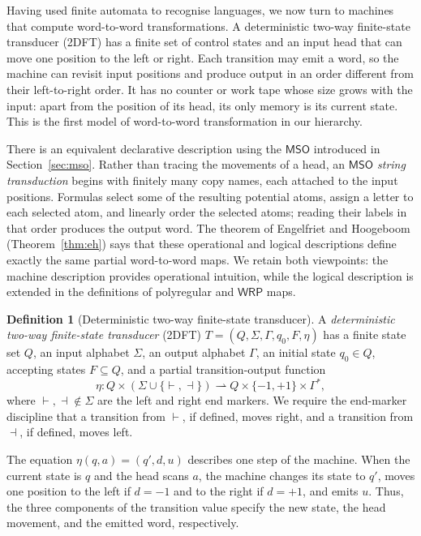 \documentclass[11pt]{article}
\theoremstyle{definition}
\newtheorem{definition}[theorem]{Definition}
\newcommand{\WRP}{\mathsf{WRP}}
\newcommand{\MSO}{\mathsf{MSO}}
\begin{document}
Having used finite automata to recognise languages, we now turn to machines
that compute word-to-word transformations.  A deterministic two-way
finite-state transducer (2DFT) has a finite set of control states and an input
head that can move one position to the left or right.  Each transition may
emit a word, so the machine can revisit input positions and produce output in
an order different from their left-to-right order.  It has no counter or work
tape whose size grows with the input: apart from the position of its head, its
only memory is its current state.  This is the first model of word-to-word
transformation in our hierarchy.

There is an equivalent declarative description using the $\MSO$ introduced in
Section~\ref{sec:mso}.  Rather than tracing the movements of a head, an
\emph{$\MSO$ string transduction} begins with finitely many copy names, each
attached to the input positions.  Formulas select some of the resulting
potential atoms, assign a letter to each selected atom, and linearly order the
selected atoms;
reading their labels in that order produces the output word.  The theorem of
Engelfriet and Hoogeboom (Theorem~\ref{thm:eh}) says that these operational and
logical descriptions define exactly the same partial word-to-word maps.  We
retain both viewpoints: the machine description provides operational
intuition, while the logical description is extended in the definitions of
polyregular and $\WRP$ maps.

\begin{definition}[Deterministic two-way finite-state transducer]
\label{def:2dft}
A \emph{deterministic two-way finite-state transducer} (2DFT)
$T=(Q,\Sigma,\Gamma,q_0,F,\eta)$ has a finite state set $Q$, an input alphabet
$\Sigma$, an output alphabet $\Gamma$, an initial state $q_0\in Q$, accepting
states $F\subseteq Q$, and a partial transition-output function
\[
   \eta\colon Q\times(\Sigma\cup\{\vdash,\dashv\})
     \rightharpoonup Q\times\{-1,+1\}\times\Gamma^*,
\]
where ${\vdash},{\dashv}\notin\Sigma$ are the left and right end markers.  We require
the end-marker discipline that a transition from $\vdash$, if defined, moves
right, and a transition from $\dashv$, if defined, moves left.
\end{definition}

The equation $\eta(q,a)=(q',d,u)$ describes one step of the machine.  When the
current state is $q$ and the head scans $a$, the machine changes its state to
$q'$, moves one position to the left if $d=-1$ and to the right if $d=+1$, and
emits $u$.  Thus, the three components of the transition value specify the new
state, the head movement, and the emitted word, respectively.
\end{document}
